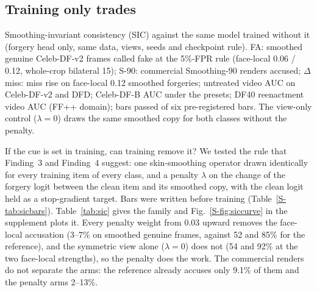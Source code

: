 \documentclass[journal]{IEEEtran}  %
\begin{document}
\subsection{Training only trades}
\label{sec:sic}
\begin{table}[t]
\centering
\caption{Smoothing-invariant consistency (SIC) against the same model trained without it (forgery head only, same data,
views, seeds and checkpoint rule). FA: smoothed genuine Celeb-DF-v2 frames called fake at the 5\%-FPR rule (face-local 0.06 /
0.12, whole-crop bilateral 15); S-90: commercial Smoothing-90 renders accused; $\Delta$miss: miss rise on face-local 0.12
smoothed forgeries; untreated video AUC on Celeb-DF-v2 and DFD; Celeb-DF-B AUC under the presets; DF40 reenactment video AUC
(FF++ domain); bars passed of six pre-registered bars. The view-only control ($\lambda=0$) draws the same smoothed copy for
both classes without the penalty.}
\label{tab:sic}
\footnotesize
\begin{adjustbox}{max width=\textwidth}\end{adjustbox}
\end{table}

If the cue is set in training, can training remove it? We tested the rule that Finding~3 and Finding~4 suggest: one
skin-smoothing operator drawn identically for every training item of every class, and a penalty $\lambda$ on the change of
the forgery logit between the clean item and its smoothed copy, with the clean logit held as a stop-gradient target. Bars
were written before training (Table~\ref{S-tab:sicbars}). Table~\ref{tab:sic} gives the family and Fig.~\ref{S-fig:siccurve} in the supplement plots it. Every penalty
weight from 0.03 upward removes the face-local accusation (3--7\% on smoothed genuine frames, against 52 and 85\% for the
reference), and the symmetric view alone ($\lambda=0$) does not (54 and 92\% at the two face-local strengths), so the
penalty does the work. The commercial renders do not separate the arms: the reference already accuses only 9.1\% of them
and the penalty arms 2--13\%.

\end{document}
